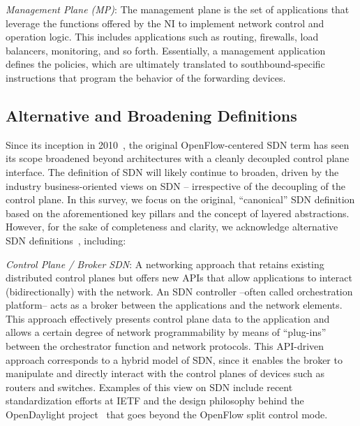 \noindent \textit{Management Plane (MP)}: The management plane is the set of applications that leverage 
the functions offered by the NI to implement network control and operation logic.
This includes applications such as routing, firewalls, load balancers, monitoring, and so forth.
Essentially, a management application defines the policies, which are ultimately translated to 
southbound-specific instructions that program the behavior of the forwarding devices.

\subsection{Alternative and Broadening Definitions}
\label{sec:alt-SDN}


Since its inception in 2010~\cite{greene2009}, the original OpenFlow-centered SDN term 
has seen its scope broadened beyond architectures with a cleanly decoupled control plane 
interface. The definition of SDN will likely continue to broaden, driven by the industry 
business-oriented views on SDN -- irrespective of the decoupling of the control plane. In 
this survey, we focus on the original, ``canonical'' SDN definition based on the aforementioned
key pillars and the concept of layered abstractions. However, for the sake of completeness 
and clarity, we acknowledge alternative SDN definitions~\cite{nadeau2013}, including:

\noindent \textit{Control Plane / Broker SDN}: A networking approach that retains existing distributed 
control planes but offers new APIs that allow applications to interact (bidirectionally) with the network. 
An SDN controller --often called orchestration platform-- acts as a broker between the applications and 
the network elements. This approach effectively presents control plane data to the application and allows 
a certain degree of network programmability by means of ``plug-ins'' between the orchestrator function and 
network protocols. This API-driven approach corresponds to a hybrid model of SDN, since it enables the broker 
to manipulate and directly interact with the control planes of devices such as routers and switches. Examples 
of this view on SDN include recent standardization efforts at IETF  and the design philosophy behind the OpenDaylight project~\cite{opendaylight2013} that goes beyond the OpenFlow split control mode.

